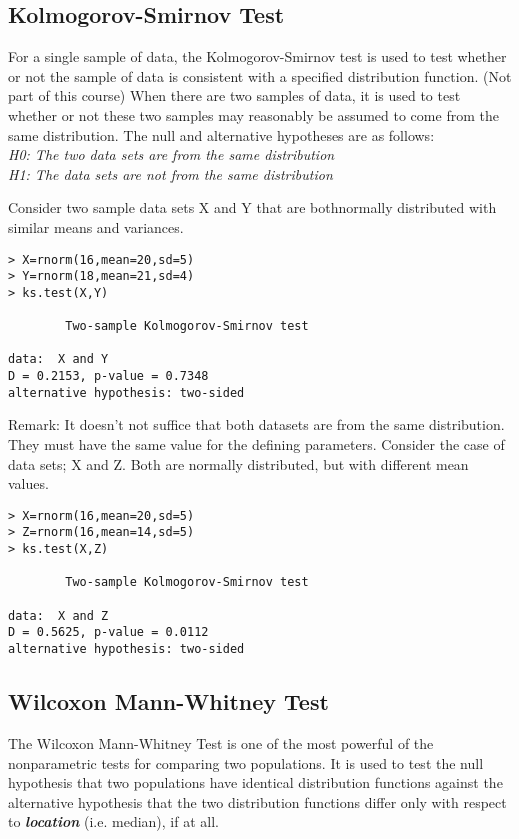 \documentclass[a4paper,12pt]{article}
\begin{document}
\subsection{Kolmogorov-Smirnov Test}

For a single sample of data, the Kolmogorov-Smirnov test is used to test whether or not the sample of data is consistent with a specified distribution function. (Not part of this course)
When there are two samples of data, it is used to test whether or not these two samples may reasonably be assumed to come from the same distribution.
The null and alternative hypotheses are as follows:\\
\emph{
H0: The two data sets are from the same distribution\\
H1: The data sets are not from the same distribution\\
}

Consider two sample data sets X and Y that are bothnormally distributed with similar means and variances.
\begin{framed}
\begin{verbatim}
> X=rnorm(16,mean=20,sd=5)
> Y=rnorm(18,mean=21,sd=4)
> ks.test(X,Y)

        Two-sample Kolmogorov-Smirnov test

data:  X and Y
D = 0.2153, p-value = 0.7348
alternative hypothesis: two-sided
\end{verbatim}
\end{framed}
Remark: It doesn’t not suffice that both datasets are from the same distribution. They must have the same value for the defining parameters. Consider the case of data sets; X and Z. Both are normally distributed, but with different mean values.
\begin{framed}
\begin{verbatim}
> X=rnorm(16,mean=20,sd=5)
> Z=rnorm(16,mean=14,sd=5)
> ks.test(X,Z)

        Two-sample Kolmogorov-Smirnov test

data:  X and Z
D = 0.5625, p-value = 0.0112
alternative hypothesis: two-sided
\end{verbatim}
\end{framed}

\subsection{Wilcoxon Mann-Whitney Test}
The Wilcoxon Mann-Whitney Test is one of the most powerful of the nonparametric tests for comparing two populations. It is used to test the null hypothesis that two populations have identical distribution functions against the alternative hypothesis that the two distribution functions differ only with respect to \textbf{\emph{location}} (i.e. median), if at all.
\end{document}
